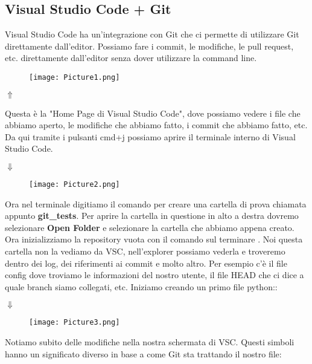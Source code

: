 \documentclass[a4paper,12pt]{article}
\begin{document}
\subsection{Visual Studio Code + Git}
Visual Studio Code ha un'integrazione con Git che ci permette di utilizzare Git direttamente dall'editor. Possiamo fare i commit, le modifiche, le pull request, etc. direttamente dall'editor senza dover utilizzare la command line.
\begin{figure}[H]
  \centering
  \texttt{[image: Picture1.png]}
  \label{etichetta1}
\end{figure}
\begin{center}
$\Uparrow$
\end{center}
Questa è la "Home Page di Visual Studio Code", dove possiamo vedere i file che abbiamo aperto, le modifiche che abbiamo fatto, i commit che abbiamo fatto, etc.
Da qui tramite i pulsanti cmd+j possiamo aprire il terminale interno di Visual Studio Code.
\begin{center}
$\Downarrow$
\end{center}
\begin{figure}[H]
  \centering
  \texttt{[image: Picture2.png]}
  \label{etichetta2}
\end{figure}
Ora nel terminale digitiamo il comando  per creare una cartella di prova chiamata appunto \textbf{git\_tests}.
Per aprire la cartella in questione in alto a destra dovremo selezionare \textbf{Open Folder} e selezionare la cartella che abbiamo appena creato.
Ora inizializziamo la repository vuota con il comando sul terminare . Noi questa cartella non la vediamo da VSC, nell'explorer possiamo vederla e troveremo dentro dei log, dei riferimenti ai commit e molto altro. Per esempio c'è il file config dove troviamo le informazioni del nostro utente, il file HEAD che ci dice a quale branch siamo collegati, etc.
Iniziamo creando un primo file python::
\begin{center}
    $\Downarrow $
\end{center}
\begin{figure}[H]
  \centering
  \texttt{[image: Picture3.png]}
  \label{etichetta3}
\end{figure}
Notiamo subito delle modifiche nella nostra schermata di VSC. Questi simboli hanno un significato diverso in base a come Git sta trattando il nostro file:
\end{document}
